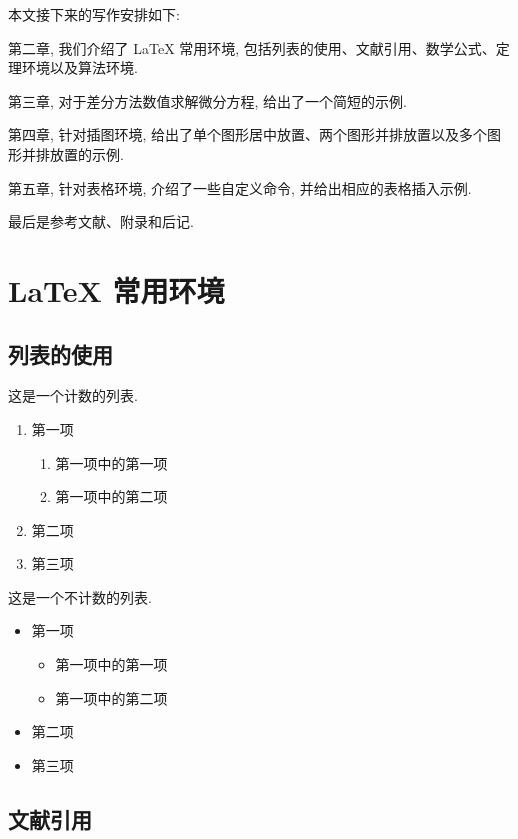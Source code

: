 \documentclass[UTF8,openany]{ctexbook}
\numberwithin{equation}{chapter}
\numberwithin{figure}{chapter}
\numberwithin{table}{chapter}
\theoremstyle{mystyle}
\begin{document}
本文接下来的写作安排如下:

第二章, 我们介绍了 LaTeX 常用环境, 包括列表的使用、文献引用、数学公式、定理环境以及算法环境.

第三章, 对于差分方法数值求解微分方程, 给出了一个简短的示例.

第四章, 针对插图环境, 给出了单个图形居中放置、两个图形并排放置以及多个图形并排放置的示例.

第五章, 针对表格环境, 介绍了一些自定义命令, 并给出相应的表格插入示例.

最后是参考文献、附录和后记.




\chapter{LaTeX 常用环境}

\section{列表的使用}\label{sec:2-1}

这是一个计数的列表.
\begin{enumerate}%
  \item 第一项
    \begin{enumerate}
      \item 第一项中的第一项
      \item 第一项中的第二项
    \end{enumerate}
  \item 第二项
  \item 第三项
\end{enumerate}

这是一个不计数的列表.
\begin{itemize}%
  \item 第一项
  \begin{itemize}
    \item 第一项中的第一项
    \item 第一项中的第二项
  \end{itemize}
  \item 第二项
  \item 第三项
\end{itemize}


\section{文献引用}\label{sec:2-2}
\end{document}
